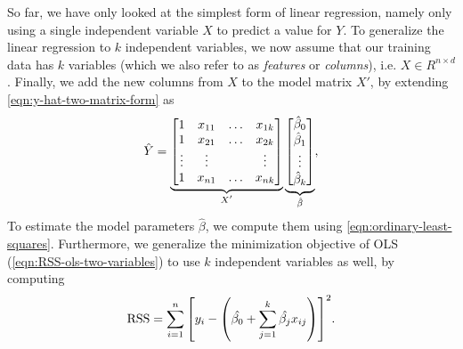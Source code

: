 So far, we have only looked at the simplest form of linear regression, namely only using a single independent variable $X$ to predict a value for $Y$. To generalize the linear regression to $k$ independent variables, we now assume that our training data has $k$ variables (which we also refer to as \textit{features} or \textit{columns}), i.e. $X \in R^{n \times d}$. Finally, we add the new columns from $X$ to the model matrix $X'$, by extending \cref{eqn:y-hat-two-matrix-form} as
\begin{align}
    \hat{Y} =
        \undertext{
        \begin{bmatrix}
            1 & x_{11} & \ldots & x_{1k} \\
            1 & x_{21} & \ldots & x_{2k} \\
            \vdots & \vdots & & \vdots \\
            1 & x_{n1} & \ldots & x_{nk} \\
        \end{bmatrix}
        }{$X'$}
        \undertext{
        \begin{bmatrix}
            \hat{\beta}_0 \\
            \hat{\beta}_1 \\
            \vdots \\
            \hat{\beta}_k \\
        \end{bmatrix}
        }{$\hat{\beta}$},
    \label{eqn:y-hat-matrix-form-general}
\end{align}
To estimate the model parameters $\hat{\beta}$, we compute them using \cref{eqn:ordinary-least-squares}. Furthermore, we generalize the minimization objective of OLS (\cref{eqn:RSS-ols-two-variables}) to use $k$ independent variables as well, by computing
\begin{align}
    \text{RSS} = \sum\limits_{i=1}^{n}{\left[y_i - \left(\hat{\beta_0} +  \sum\limits_{j=1}^{k}{\hat{\beta_j}x_{ij}}\right)\right]^2}.
    \label{eqn:RSS-ols-k-variables}
\end{align}

